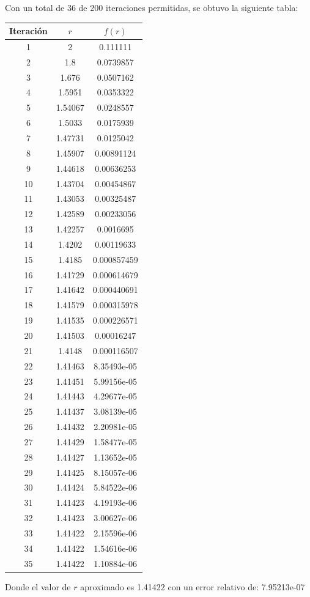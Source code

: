 \documentclass[10pt]{article}
\begin{document}
\begin{enumerate}
Con un total de 36 de 200 iteraciones permitidas, se obtuvo la siguiente tabla:
\begin{center}
\begin{tabular}{|c|c|c|}
\hline
Iteraci\'on&$r$&$f(r)$\\
\hline
1&2&0.111111\\
2&1.8&0.0739857\\
3&1.676&0.0507162\\
4&1.5951&0.0353322\\
5&1.54067&0.0248557\\
6&1.5033&0.0175939\\
7&1.47731&0.0125042\\
8&1.45907&0.00891124\\
9&1.44618&0.00636253\\
10&1.43704&0.00454867\\
11&1.43053&0.00325487\\
12&1.42589&0.00233056\\
13&1.42257&0.0016695\\
14&1.4202&0.00119633\\
15&1.4185&0.000857459\\
16&1.41729&0.000614679\\
17&1.41642&0.000440691\\
18&1.41579&0.000315978\\
19&1.41535&0.000226571\\
20&1.41503&0.00016247\\
21&1.4148&0.000116507\\
22&1.41463&8.35493e-05\\
23&1.41451&5.99156e-05\\
24&1.41443&4.29677e-05\\
25&1.41437&3.08139e-05\\
26&1.41432&2.20981e-05\\
27&1.41429&1.58477e-05\\
28&1.41427&1.13652e-05\\
29&1.41425&8.15057e-06\\
30&1.41424&5.84522e-06\\
31&1.41423&4.19193e-06\\
32&1.41423&3.00627e-06\\
33&1.41422&2.15596e-06\\
34&1.41422&1.54616e-06\\
35&1.41422&1.10884e-06\\
\hline
\end{tabular}
\end{center}
Donde el valor de $r$ aproximado es 1.41422 con un error relativo de: 7.95213e-07

\end{enumerate}
\end{document}
